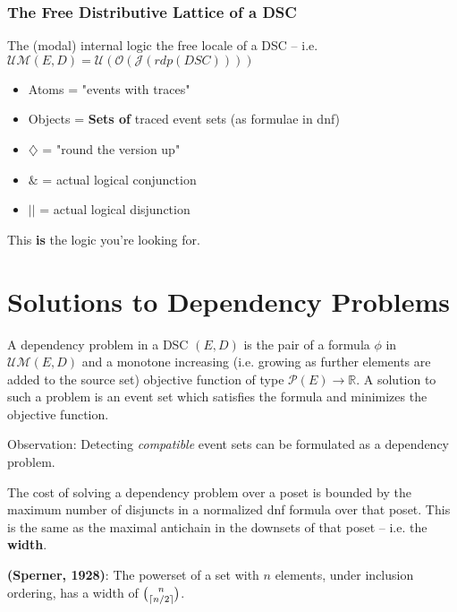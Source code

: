 \documentclass{beamer}
\newcommand{\UMc}{\mathcal{UM}}
\newcommand{\Oc}{\mathcal{O}}
\newcommand{\Pc}{\mathcal{P}}
\newcommand{\Ucc}{\mathcal{U}}
\newcommand{\Jc}{\mathcal{J}}
\newcommand{\Dia}{\diamondsuit}
\DeclarePairedDelimiter\ceil{\lceil}{\rceil}
\begin{document}
\begin{frame}
\frametitle{The Free Distributive Lattice of a DSC}
The (modal) internal logic the free locale of a DSC -- i.e. \(\UMc(E,D)  = \Ucc(\Oc(\Jc(rdp(DSC))))\)

\begin{itemize}
\item Atoms = "events with traces"
\item Objects = \textbf{Sets of} traced event sets (as formulae in dnf)
\item \(\Dia\) =  "round the version up"
\item \(\&\) = actual logical conjunction
\item \(||\) = actual logical disjunction
\end{itemize}

This \textbf{is} the logic you're looking for.

\end{frame}

\section{Solutions to Dependency Problems}
\begin{frame}
\begin{definition}
A dependency problem in a DSC \((E,D)\) is the pair of a formula \(\phi\) in \(\UMc(E,D)\) and a monotone increasing (i.e. growing as further elements are added to the source set) objective function of type \(\Pc(E) \rightarrow \mathbb{R}\). A solution to such a problem is an event set which satisfies the formula and minimizes the objective function.
\end{definition}

Observation: Detecting \textit{compatible} event sets can be formulated as a dependency problem.
\end{frame}

\begin{frame}
The cost of solving a dependency problem over a poset is bounded by the maximum number of disjuncts in a normalized dnf formula over that poset. This is the same as the maximal antichain in the downsets of that poset -- i.e. the \textbf{width}.

\begin{theorem}
\textbf{(Sperner, 1928)}: The powerset of a set with \(n\) elements, under inclusion ordering, has a width of \(\binom{n}{\ceil{n/2}}\).
\end{theorem}
\end{frame}
\end{document}
